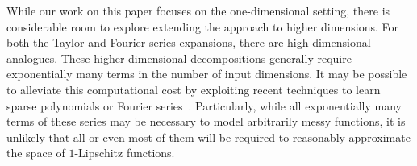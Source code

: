 \documentclass[letterpaper]{article} %
\begin{document}
While our work on this paper focuses on the one-dimensional setting, there is considerable room to explore extending the approach to higher dimensions. For both the Taylor and Fourier series expansions, there are high-dimensional analogues. These higher-dimensional decompositions generally require exponentially many terms in the number of input dimensions. It may be possible to alleviate this computational cost by exploiting recent techniques to learn sparse polynomials or Fourier series~\cite{Andoni2014LearningSP,Hassanieh2012NearlyOS}. Particularly, while all exponentially many terms of these series may be necessary to model arbitrarily messy functions, it is unlikely that all or even most of them will be required to reasonably approximate the space of $1$-Lipschitz functions.



\newpage



\end{document}
